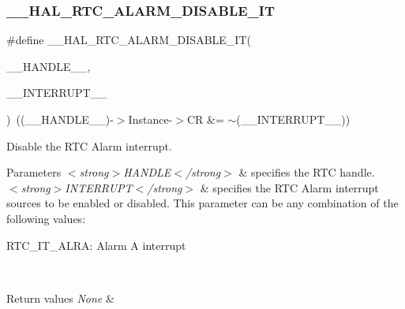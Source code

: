 \subsubsection{\texorpdfstring{\+\_\+\+\_\+\+H\+A\+L\+\_\+\+R\+T\+C\+\_\+\+A\+L\+A\+R\+M\+\_\+\+D\+I\+S\+A\+B\+L\+E\+\_\+\+IT}{\_\_HAL\_RTC\_ALARM\_DISABLE\_IT}}
{\footnotesize\ttfamily \#define \+\_\+\+\_\+\+H\+A\+L\+\_\+\+R\+T\+C\+\_\+\+A\+L\+A\+R\+M\+\_\+\+D\+I\+S\+A\+B\+L\+E\+\_\+\+IT(\begin{DoxyParamCaption}\item[{}]{\+\_\+\+\_\+\+H\+A\+N\+D\+L\+E\+\_\+\+\_\+,  }\item[{}]{\+\_\+\+\_\+\+I\+N\+T\+E\+R\+R\+U\+P\+T\+\_\+\+\_\+ }\end{DoxyParamCaption})~((\+\_\+\+\_\+\+H\+A\+N\+D\+L\+E\+\_\+\+\_\+)-\/$>$Instance-\/$>$CR \&= $\sim$(\+\_\+\+\_\+\+I\+N\+T\+E\+R\+R\+U\+P\+T\+\_\+\+\_\+))}



Disable the R\+TC Alarm interrupt. 


\begin{DoxyParams}{Parameters}
{\em $<$strong$>$\+H\+A\+N\+D\+L\+E$<$/strong$>$} & specifies the R\+TC handle. \\
\hline
{\em $<$strong$>$\+I\+N\+T\+E\+R\+R\+U\+P\+T$<$/strong$>$} & specifies the R\+TC Alarm interrupt sources to be enabled or disabled. This parameter can be any combination of the following values\+: \begin{DoxyItemize}
\item R\+T\+C\+\_\+\+I\+T\+\_\+\+A\+L\+RA\+: Alarm A interrupt \end{DoxyItemize}
\\
\hline
\end{DoxyParams}

\begin{DoxyRetVals}{Return values}
{\em None} & \\
\hline
\end{DoxyRetVals}
\mbox{\label{group___r_t_c___exported___macros_gab40f07ff2cdf6fc98ccfdd856ba934e4}} 
